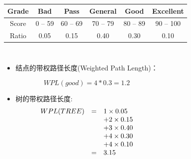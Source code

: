 \begin{frame}

  \begin{tabular}{|c|c|c|c|c|c|}
    \hline
    Grade & Bad & Pass & General & Good & Excellent \\ \hline
    Score & 0 -- 59 & 60 -- 69 & 70 -- 79 & 80 -- 89 & 90 -- 100 \\ \hline
    Ratio & 0.05 & 0.15 & 0.40 & 0.30 & 0.10 \\ \hline
  \end{tabular}

  \begin{columns}[T]

    \begin{itemize}
    \item 结点的带权路径长度(Weighted Path Length)：

      \[WPL(good) = 4*0.3=1.2 \]
      
    \item 树的带权路径长度:
      \begin{equation*}
        \begin{array}{r c l}
          WPL(TREE) & = & 1 \times 0.05  \\
          & & + 2 \times 0.15 \\
          & & + 3 \times 0.40 \\
          & & + 4 \times 0.30 \\
          & & + 4 \times 0.10 \\
          & = & 3.15 \\
        \end{array}
      \end{equation*}
    \end{itemize}
  \end{columns}
\end{frame}

